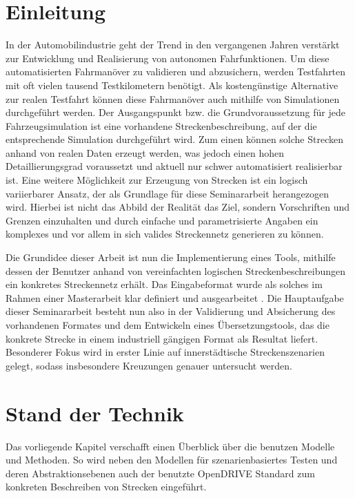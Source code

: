 \thispagestyle{ika}

\chapter{Einleitung}

In der Automobilindustrie geht der Trend in den vergangenen Jahren verstärkt zur Entwicklung und Realisierung von autonomen Fahrfunktionen. Um diese automatisierten Fahrmanöver zu validieren und abzusichern, werden Testfahrten mit oft vielen tausend Testkilometern benötigt. Als kostengünstige Alternative zur realen Testfahrt können diese Fahrmanöver auch mithilfe von Simulationen durchgeführt werden. Der Ausgangspunkt bzw. die Grundvoraussetzung für jede Fahrzeugsimulation ist eine vorhandene Streckenbeschreibung, auf der die entsprechende Simulation durchgeführt wird. Zum einen können solche Strecken anhand von realen Daten erzeugt werden, was jedoch einen hohen Detaillierungsgrad voraussetzt und aktuell nur schwer automatisiert realisierbar ist. Eine weitere Möglichkeit zur Erzeugung von Strecken ist ein logisch variierbarer Ansatz, der als Grundlage für diese Seminararbeit herangezogen wird. Hierbei ist nicht das Abbild der Realität das Ziel, sondern Vorschriften und Grenzen einzuhalten und durch einfache und parametrisierte Angaben ein komplexes und vor allem in sich valides Streckennetz generieren zu können.

Die Grundidee dieser Arbeit ist nun die Implementierung eines Tools, mithilfe dessen der Benutzer anhand von vereinfachten logischen Streckenbeschreibungen ein konkretes Streckennetz erhält. Das Eingabeformat wurde als solches im Rahmen einer Masterarbeit klar definiert und ausgearbeitet \cite{Russ.2019}. Die Hauptaufgabe dieser Seminararbeit besteht nun also in der Validierung und Absicherung des vorhandenen Formates und dem Entwickeln eines Übersetzungstools, das die konkrete Strecke in einem industriell gängigen Format als Resultat liefert. Besonderer Fokus wird in erster Linie auf innerstädtische Streckenszenarien gelegt, sodass insbesondere Kreuzungen genauer untersucht werden.

\chapter{Stand der Technik}
Das vorliegende Kapitel verschafft einen Überblick über die benutzen Modelle und Methoden. So wird neben den Modellen für szenarienbasiertes Testen und deren Abstraktionsebenen auch der benutzte OpenDRIVE Standard zum konkreten Beschreiben von Strecken eingeführt.


